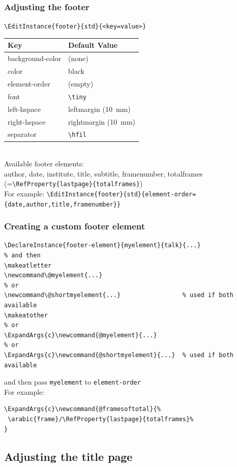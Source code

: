 \documentclass{ltx-talk}
\newcommand{\cs}[1]{\texttt{\textbackslash #1}}
\newcommand{\tubbraced}[1]{\texttt{\{#1\}}}
\begin{document}
\begin{frame*}
\frametitle{Adjusting the footer}
\verb|\EditInstance{footer}{std}{<key=value>}|\\\medskip
\begin{tabular}{ll}\toprule
Key & Default Value\\\midrule
background-color & (none)\\
color & black \\
element-order & (empty)\\
font & \cs{tiny}\\
left-hspace & leftmargin (\qty{10}{mm}) \\
right-hspace & rightmargin (\qty{10}{mm}) \\
separator & \cs{hfil}\\\bottomrule
\end{tabular}\\\medskip
Available footer elements:\\
author, date, institute, title, subtitle, framenumber,
totalframes (=\cs{RefProperty}\tubbraced{lastpage}\tubbraced{totalframes})\\
For example:
\verb|\EditInstance{footer}{std}{element-order={date,author,title,framenumber}}|
\end{frame*}

\begin{frame*}
\frametitle{Creating a custom footer element}
\begin{lstlisting}
\DeclareInstance{footer-element}{myelement}{talk}{...}
% and then
\makeatletter
\newcommand\@myelement{...}
% or
\newcommand\@shortmyelement{...}                 % used if both available
\makeatother
% or
\ExpandArgs{c}\newcommand{@myelement}{...}
% or
\ExpandArgs{c}\newcommand{@shortmyelement}{...}  % used if both available
\end{lstlisting}\bigskip
and then pass \texttt{myelement} to \texttt{element-order}\\
For example:
\begin{lstlisting}
\ExpandArgs{c}\newcommand{@framesoftotal}{%
 \arabic{frame}/\RefProperty{lastpage}{totalframes}%
}
\end{lstlisting}
\end{frame*}

\subsection{Adjusting the title page}
\end{document}
